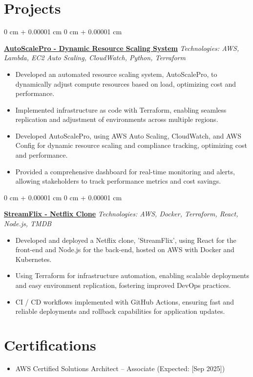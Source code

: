 \documentclass[10pt, letterpaper]{article}
\newenvironment{highlights}{
    \begin{itemize}[
        topsep=0.10 cm,
        parsep=0.10 cm,
        partopsep=0pt,
        itemsep=0pt,
        leftmargin=0 cm + 10pt
    ]
}{
    \end{itemize}
}
\newenvironment{onecolentry}{
    \begin{adjustwidth}{
        0 cm + 0.00001 cm
    }{
        0 cm + 0.00001 cm
    }
}{
    \end{adjustwidth}
}
\begin{document}
\section{Projects}
\vspace{0.10 cm}
\begin{onecolentry}
    \textbf{\href{https://github.com/talatops/autoscalepro}{AutoScalePro - Dynamic Resource Scaling System}}
    \textit{Technologies: AWS, Lambda, EC2 Auto Scaling, CloudWatch, Python, Terraform}
    \begin{highlights}
        \item Developed an automated resource scaling system, AutoScalePro, to dynamically adjust compute resources based on load, optimizing cost and performance.
        \item Implemented infrastructure as code with Terraform, enabling seamless replication and adjustment of environments across multiple regions.
        \item Developed AutoScalePro, using AWS Auto Scaling, CloudWatch, and AWS Config for dynamic resource scaling and compliance tracking, optimizing cost and performance.
        \item Provided a comprehensive dashboard for real-time monitoring and alerts, allowing stakeholders to track performance metrics and cost savings.
    \end{highlights}
\end{onecolentry}
\vspace{0.10 cm}

\begin{onecolentry}
    \textbf{\href{https://github.com/talatops/NETFLIXclone.git}{StreamFlix - Netflix Clone}}
    \textit{Technologies: AWS, Docker, Terraform, React, Node.js, TMDB}
    \begin{highlights}
        \item Developed and deployed a Netflix clone, 'StreamFlix', using React for the front-end and Node.js for the back-end, hosted on AWS with Docker and Kubernetes.
        \item Using Terraform for infrastructure automation, enabling scalable deployments and easy environment replication, fostering improved DevOps practices.
        \item CI / CD workflows implemented with GitHub Actions, ensuring fast and reliable deployments and rollback capabilities for application updates.
    \end{highlights}
\end{onecolentry}
\vspace{0.10 cm}

\section*{Certifications}
   \begin{itemize}
       \item AWS Certified Solutions Architect – Associate (Expected: [Sep 2025])
   \end{itemize}
\end{document}
